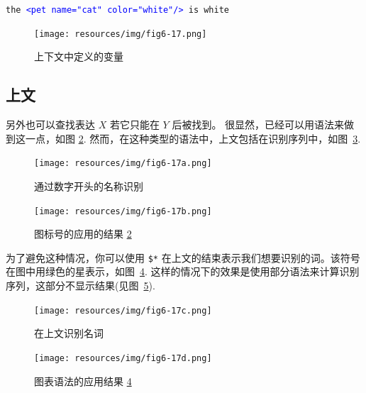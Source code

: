 \bigskip
\texttt{the \textcolor{blue}{<pet name="cat" color="white"/>} is white}

\bigskip

\begin{figure}[!h]
\begin{center}
\texttt{[image: resources/img/fig6-17.png]}
\caption{上下文中定义的变量\label{fig-context6}}
\end{center}
\end{figure}

\subsection{上文}
\index{\verb+$*+}
另外也可以查找表达 $X$ 若它只能在 $Y$ 后被找到。 很显然，已经可以用语法来做到这一点，如图 \ref{fig-left-context1}. 
然而，在这种类型的语法中，上文包括在识别序列中，如图~\ref{fig-left-context2}.

\begin{figure}[!ht]
\begin{center}
\texttt{[image: resources/img/fig6-17a.png]}
\caption{通过数字开头的名称识别\label{fig-left-context1}}
\end{center}
\end{figure}

\begin{figure}[!ht]
\begin{center}
\texttt{[image: resources/img/fig6-17b.png]}
\caption{图标号的应用的结果
\ref{fig-left-context1}\label{fig-left-context2}}
\end{center}
\end{figure}

\bigskip
\noindent 为了避免这种情况，你可以使用 \verb+$*+ 在上文的结束表示我们想要识别的词。该符号在图中用绿色的星表示，如图~\ref{fig-left-context3}. 这样的情况下的效果是使用部分语法来计算识别序列，这部分不显示结果(见图~\ref{fig-left-context4}).

\begin{figure}[!ht]
\begin{center}
\texttt{[image: resources/img/fig6-17c.png]}
\caption{在上文识别名词\label{fig-left-context3}}
\end{center}
\end{figure}

\begin{figure}[!ht]
\begin{center}
\texttt{[image: resources/img/fig6-17d.png]}
\caption{图表语法的应用结果
\ref{fig-left-context3}\label{fig-left-context4}}
\end{center}
\end{figure}

